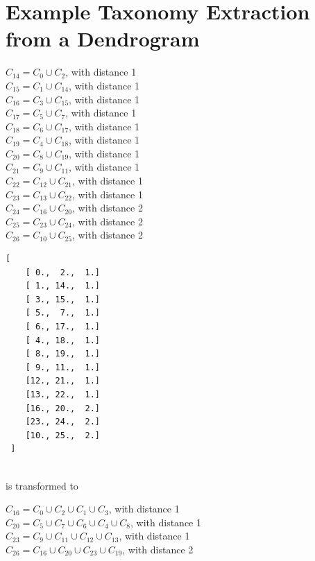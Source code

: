 \section{Example Taxonomy Extraction from a Dendrogram}\label{\positionnumber}
\begin{minipage}{0.48\textwidth}
$C_{14} = C_0 \cup C_2$, with distance 1 \\
$C_{15} = C_1 \cup C_{14}$, with distance 1 \\
$C_{16} = C_3 \cup C_{15}$, with distance 1 \\
$C_{17} = C_5 \cup C_7$, with distance 1 \\
$C_{18} = C_6 \cup C_{17}$, with distance 1 \\
$C_{19} = C_4 \cup C_{18}$, with distance 1 \\
$C_{20} = C_8 \cup C_{19}$, with distance 1 \\
$C_{21} = C_9 \cup C_{11}$, with distance 1 \\
$C_{22} = C_{12} \cup C_{21}$, with distance 1 \\
$C_{23} = C_{13} \cup C_{22}$, with distance 1 \\
$C_{24} = C_{16} \cup C_{20}$, with distance 2 \\
$C_{25} = C_{23} \cup C_{24}$, with distance 2 \\
$C_{26} = C_{10} \cup C_{25}$, with distance 2 \\
\end{minipage} \hfill
\begin{minipage}{0.48\textwidth}
\begin{verbatim}
[
    [ 0.,  2.,  1.]
    [ 1., 14.,  1.]
    [ 3., 15.,  1.]
    [ 5.,  7.,  1.]
    [ 6., 17.,  1.]
    [ 4., 18.,  1.]
    [ 8., 19.,  1.]
    [ 9., 11.,  1.]
    [12., 21.,  1.]
    [13., 22.,  1.]
    [16., 20.,  2.]
    [23., 24.,  2.]
    [10., 25.,  2.]
 ]
 \end{verbatim}
\end{minipage} \\
is transformed to \\ \vspace{0.5cm}
\begin{minipage}{0.48\textwidth}
$C_{16} = C_0 \cup C_2 \cup C_1 \cup C_3$, with distance 1 \\  
$C_{20} = C_5 \cup C_7 \cup C_6 \cup C_4 \cup C_8$, with distance 1 \\ 
$C_{23} = C_9 \cup C_{11} \cup C_{12} \cup C_{13}$, with distance 1 \\ 
$C_{26} = C_{16} \cup C_{20} \cup C_{23} \cup C_{19}$, with distance 2 \\   
\end{minipage} 
